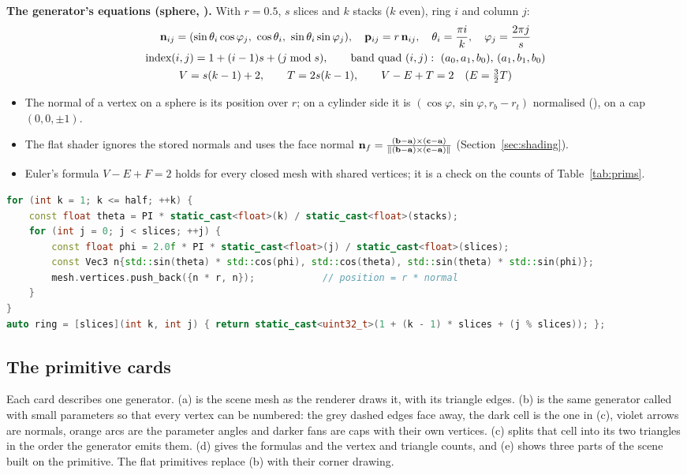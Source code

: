 \textbf{The generator's equations (sphere, ).} With $r=0.5$, $s$ slices and
$k$ stacks ($k$ even), ring $i$ and column $j$:
\begin{gather}
\vect n_{ij}=(\sin\theta_i\cos\varphi_j,\ \cos\theta_i,\ \sin\theta_i\sin\varphi_j),\quad \vect p_{ij}=r\,\vect n_{ij},\quad
\theta_i=\frac{\pi i}{k},\quad \varphi_j=\frac{2\pi j}{s}\label{eq:spheregen}\\
\text{index}(i,j)=1+(i-1)s+(j\bmod s),\qquad \text{band quad }(i,j):\ (a_0,a_1,b_0),\,(a_1,b_1,b_0)\nonumber\\
V=s(k-1)+2,\qquad T=2s(k-1),\qquad V-E+T=2\quad (E=\tfrac32T)\nonumber
\end{gather}
\begin{itemize}
\item The normal of a vertex on a sphere is its position over $r$; on a cylinder side it is $(\cos\varphi,\sin\varphi,r_b-r_t)$
normalised (), on a cap $(0,0,\pm1)$.
\item The flat shader ignores the stored normals and uses the face normal
$\mathbf{n}_f=\frac{(\mathbf{b}-\mathbf{a})\times(\mathbf{c}-\mathbf{a})}{\lVert(\mathbf{b}-\mathbf{a})\times(\mathbf{c}-\mathbf{a})\rVert}$ (Section~\ref{sec:shading}).
\item Euler's formula $V-E+F=2$ holds for every closed mesh with shared vertices; it is a check on the counts of Table~\ref{tab:prims}.
\end{itemize}
\begin{lstlisting}[language=C++,caption={The northern rings of the sphere and the index of a ring vertex (\code{src/primitives/Sphere.cpp}).}]
for (int k = 1; k <= half; ++k) {
    const float theta = PI * static_cast<float>(k) / static_cast<float>(stacks);
    for (int j = 0; j < slices; ++j) {
        const float phi = 2.0f * PI * static_cast<float>(j) / static_cast<float>(slices);
        const Vec3 n{std::sin(theta) * std::cos(phi), std::cos(theta), std::sin(theta) * std::sin(phi)};
        mesh.vertices.push_back({n * r, n});            // position = r * normal
    }
}
auto ring = [slices](int k, int j) { return static_cast<uint32_t>(1 + (k - 1) * slices + (j % slices)); };
\end{lstlisting}

\subsection{The primitive cards}
\label{sec:primcards}
Each card describes one generator. (a) is the scene mesh as the renderer draws it, with its triangle edges. (b) is
the same generator called with small parameters so that every vertex can be numbered: the grey dashed edges face away,
the dark cell is the one in (c), violet arrows are normals, orange arcs are the parameter angles and darker fans are
caps with their own vertices. (c) splits that cell into its two triangles in the order the generator emits them.
(d) gives the formulas and the vertex and triangle counts, and (e) shows three parts of the scene built on the
primitive. The flat primitives replace (b) with their corner drawing.

